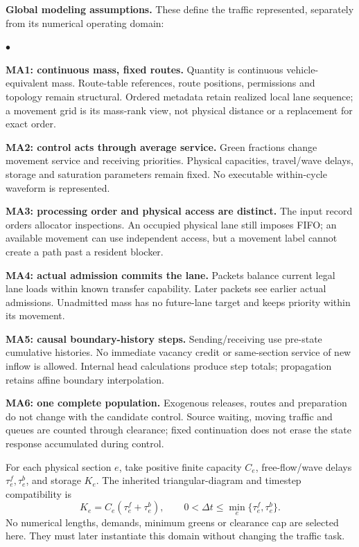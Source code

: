 \documentclass[10pt,a4paper]{article}
\newenvironment{points}{\begin{list}{$\bullet$}{%
 \setlength{\leftmargin}{1.4em}\setlength{\labelwidth}{0.7em}%
 \setlength{\labelsep}{0.4em}\setlength{\itemsep}{2pt}%
 \setlength{\parsep}{0pt}\setlength{\topsep}{3pt}}}{\end{list}}
\begin{document}
\textbf{Global modeling assumptions.} These define the traffic represented,
separately from its numerical operating domain:
\begin{points}
\item \textbf{MA1: continuous mass, fixed routes.} Quantity is continuous
vehicle-equivalent mass. Route-table references, route positions,
permissions and topology remain structural. Ordered metadata retain
realized local lane sequence; a movement grid is its mass-rank view,
not physical distance or a replacement for exact order.
\item \textbf{MA2: control acts through average service.} Green fractions
change movement service and receiving priorities. Physical capacities,
travel/wave delays, storage and saturation parameters remain fixed.
No executable within-cycle waveform is represented.
\item \textbf{MA3: processing order and physical access are distinct.}
The input record orders allocator inspections. An occupied physical lane
still imposes FIFO; an available movement can use independent access,
but a movement label cannot create a path past a resident blocker.
\item \textbf{MA4: actual admission commits the lane.} Packets balance
current legal lane loads within known transfer capability. Later packets
see earlier actual admissions. Unadmitted mass has no future-lane target
and keeps priority within its movement.
\item \textbf{MA5: causal boundary-history steps.} Sending/receiving use
pre-state cumulative histories. No immediate vacancy credit or same-section
service of new inflow is allowed. Internal head calculations produce
step totals; propagation retains affine boundary interpolation.
\item \textbf{MA6: one complete population.} Exogenous releases, routes
and preparation do not change with the candidate control. Source waiting,
moving traffic and queues are counted through clearance; fixed continuation
does not erase the state response accumulated during control.
\end{points}

For each physical section $e$, take positive finite capacity $C_e$,
free-flow/wave delays $\tau^f_e,\tau^b_e$, and storage $K_e$.
The inherited triangular-diagram and timestep compatibility is
\begin{equation}
 K_e=C_e(\tau^f_e+\tau^b_e),\qquad
 0<\Delta t\leq\min_e\{\tau^f_e,\tau^b_e\}.
 \label{eq:compact-domain}
\end{equation}
No numerical lengths, demands, minimum greens or clearance cap are
selected here. They must later instantiate this domain without changing
the traffic task.
\end{document}
